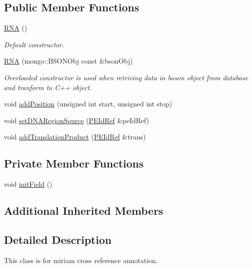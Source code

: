 \subsection*{Public Member Functions}
\begin{DoxyCompactItemize}
\item 
\hyperlink{classunisys_1_1RNA_a186626af12e4cb03b1a1ae8a22fae1f1}{R\-N\-A} ()
\begin{DoxyCompactList}\small\item\em Default constructor. \end{DoxyCompactList}\item 
\hyperlink{classunisys_1_1RNA_a4a38ebf5fb351862d1128d655f25f11b}{R\-N\-A} (mongo\-::\-B\-S\-O\-N\-Obj const \&bson\-Obj)
\begin{DoxyCompactList}\small\item\em Overloaded constructor is used when retriving data in boson object from database and tranform to C++ object. \end{DoxyCompactList}\item 
void \hyperlink{classunisys_1_1RNA_ae9e7ece2423d7722b4f4c2ffafc54bfe}{add\-Position} (unsigned int start, unsigned int stop)
\item 
void \hyperlink{classunisys_1_1RNA_a08813cac2787fcae41243c46c2006dea}{set\-D\-N\-A\-Region\-Source} (\hyperlink{classunisys_1_1PEIdRef}{P\-E\-Id\-Ref} \&pe\-Id\-Ref)
\item 
void \hyperlink{classunisys_1_1RNA_a804b761e9ca423e163bdd3d4650f24ed}{add\-Translation\-Product} (\hyperlink{classunisys_1_1PEIdRef}{P\-E\-Id\-Ref} \&trans)
\end{DoxyCompactItemize}
\subsection*{Private Member Functions}
\begin{DoxyCompactItemize}
\item 
void \hyperlink{classunisys_1_1RNA_abeb5db8942c0d2ecac49086d50d6e7ab}{init\-Field} ()
\end{DoxyCompactItemize}
\subsection*{Additional Inherited Members}


\subsection{Detailed Description}
This class is for miriam cross reference annotation. 

